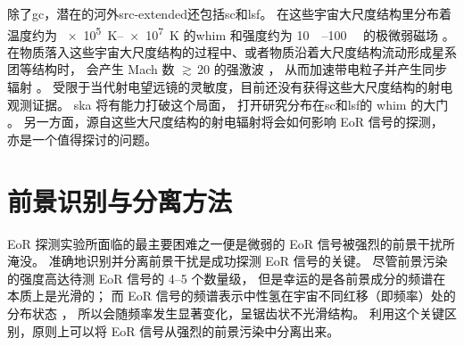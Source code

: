 除了\ac{gc}，潜在的河外\ac{src-extended}还包括\ac{sc}和\ac{lsf}。
在这些宇宙大尺度结构里分布着温度约为 \SIrange{e5}{e7}{\kelvin} 的\ac{whim}
和强度约为 \SIrange{10}{100}{\nano\gauss} 的极微弱磁场 \cite{vazza2014}。
在物质落入这些宇宙大尺度结构的过程中、或者物质沿着大尺度结构流动形成星系团等结构时，
会产生 Mach 数 $\gtrsim$\,20 的强激波 \cite{ryu2003,skillman2008}，
从而加速带电粒子并产生同步辐射 \cite{vazza2015}。
受限于当代射电望远镜的灵敏度，目前还没有获得这些大尺度结构的射电观测证据。
\ac{ska} 将有能力打破这个局面，
打开研究分布在\ac{sc}和\ac{lsf}的 \ac{whim} 的大门 \cite{vazza2015}。
另一方面，源自这些大尺度结构的射电辐射将会如何影响 EoR 信号的探测，
亦是一个值得探讨的问题。


\section{前景识别与分离方法}
\label{sec:fg-methods}

EoR 探测实验所面临的最主要困难之一便是微弱的 EoR 信号被强烈的前景干扰所淹没。
准确地识别并分离前景干扰是成功探测 EoR 信号的关键。
尽管前景污染的强度高达待测 EoR 信号的 \numrange{4}{5} 个数量级，
但是幸运的是各前景成分的频谱在本质上是光滑的；
而 EoR 信号的频谱表示中性氢在宇宙不同红移（即频率）处的分布状态
\cite{diMatteo2002,oh2003,gnedin2004}，
所以会随频率发生显著变化，呈锯齿状不光滑结构。
利用这个关键区别，原则上可以将 EoR 信号从强烈的前景污染中分离出来。

